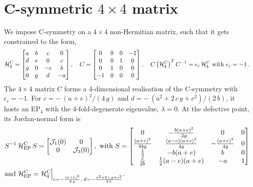 \documentclass[aps, prl, onecolumn, nofootinbib, citeautoscript, nolongbibliography]{revtex4-2}
\def \nn{\nonumber \\}
\begin{document}
\section{C-symmetric $4 \times 4$ matrix}
\label{app2}

We impose C-symmetry on a $4\times 4$ non-Hermitian matrix, such that it gets constrained to the form,
\begin{align}
\label{eqcdim4}
\mathcal H^{\rm C}_4 = \begin{bmatrix}
a & b & c & 0 \\
 d & e & 0 & c \\
 g & 0 & -e & b \\
 0 & g & d & -a \\
\end{bmatrix}, \quad
C =  \begin{bmatrix}
 0 & 0 & 0 & -1 \\
 0 & 0 & 1 & 0 \\
 0 & 1 & 0 & 0 \\
 -1 & 0 & 0 & 0 \\
\end{bmatrix},\quad
C \left( \mathcal H^{\rm C}_4 \right)^T C^{-1} = \epsilon_c  \, \mathcal H^{\rm C}_4 \text{ with } \epsilon_c = -1 \,.
\end{align}
The $4 \times 4 $ matrix $C$ forms a 4-dimensional realisation of the C-symmetry with $\epsilon_c=-1$. 
For $ c = -\,(a+e)^2 /(4\, g) $ and $ d= -\,(a^2+2 \,c\, g+e^2)/(2 \,b)$, it hosts an EP$_4$ with the 4-fold-degenerate eigenvalue, $\lambda = 0$. At the defective point, its Jordan-normal form is
\begin{align}
& S^{-1} \, {\mathcal H^{\rm C}_{\rm EP}} \, S =  \begin{bmatrix}
\mathcal J_1(0) & 0 \\
 0 & \mathcal J_3(0) \\
\end{bmatrix}, \text{ with }
S = \begin{bmatrix}
 0 & -\frac{b (a+e)^2}{2 g} & 0 & 0 \\
 \frac{(a+e)^2}{8 b g} & \frac{(a-e) (a+e)^2}{4 g} & -\frac{(a+e)^2}{4 g} & 0 \\
 \frac{1}{2} & -b (a+e) & b & 0 \\
 \frac{e}{2 b} & \frac{1}{2} (a-e) (a+e) & -a & 1 \\
\end{bmatrix} \nn
& \text{and }
{\mathcal H^{\rm C}_{\rm EP}}  = {\mathcal H^{\rm C}_4} 
\Big \vert_{c = -\frac{(a+e)^2}{4\, g},\; d = -\frac{a^2+2 \,c\, g+e^2}{2 \,b} }.
\end{align}
\end{document}
